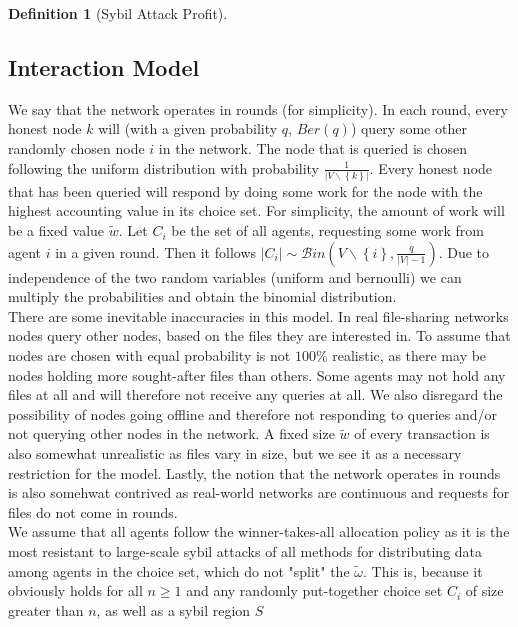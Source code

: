 \documentclass[11pt,a4paper]{article}
\theoremstyle{definition}
\newtheorem{definition}{Definition}[section]
\theoremstyle{theorem}
\theoremstyle{proposition}
\theoremstyle{corollary}
\theoremstyle{lemma}
\theoremstyle{example}
\theoremstyle{remark}
\begin{document}
\begin{definition}[Sybil Attack Profit]
\subsection{Interaction Model}
\label{subsec:Interaction Model}
\noindent{}We say that the network operates in rounds (for simplicity). In each round, every honest node $k$ will (with a given probability $q$, $Ber(q)$) query some other randomly chosen node $i$ in the network. The node that is queried is chosen following the uniform distribution with probability $\frac{1}{|V\backslash\left\lbrace{}k\right\rbrace{}|}$. Every honest node that has been queried will respond by doing some work for the node with the highest accounting value in its choice set. For simplicity, the amount of work will be a fixed value $\tilde{w}$. Let $C_i$ be the set of all agents, requesting some work from agent $i$ in a given round. Then it follows $|C_i|\sim\mathcal{B}in(V\backslash\left\lbrace{}i\right\rbrace{},\frac{q}{|V|-1})$. Due to independence of the two random variables (uniform and bernoulli) we can multiply the probabilities and obtain the binomial distribution. \vspace{1em}\\

\noindent{}There are some inevitable inaccuracies in this model. In real file-sharing networks nodes query other nodes, based on the files they are interested in. To assume that nodes are chosen with equal probability is not $100\%$ realistic, as there may be nodes holding more sought-after files than others. Some agents may not hold any files at all and will therefore not receive any queries at all. We also disregard the possibility of nodes going offline and therefore not responding to queries and/or not querying other nodes in the network. A fixed size $\tilde{w}$ of every transaction is also somewhat unrealistic as files vary in size, but we see it as a necessary restriction for the model. Lastly, the notion that the network operates in rounds is also somehwat contrived as real-world networks are continuous and requests for files do not come in rounds. \vspace{1em}\\

\noindent{}We assume that all agents follow the winner-takes-all allocation policy as it is the most resistant to large-scale sybil attacks of all methods for distributing data among agents in the choice set, which do not "split" the $\tilde{\omega}$. This is, because it obviously holds for all $n\geq{}1$ and any randomly put-together choice set $C_i$ of size greater than $n$, as well as a sybil region $S$


\end{definition}
\end{document}
